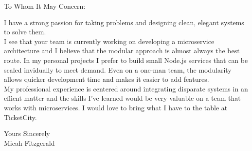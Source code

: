 \documentclass[a4paper,english]{friggeri-letter}
\begin{document}

\address{ 
   4605 Avenue A\\
   Apt \#213 \\
   Austin, TX 78751
}


\opening{To Whom It May Concern:} 
I have a strong passion for taking problems and designing clean, elegant systems to solve them.\\ 
I see that your team is currently working on developing a microservice architecture and I believe that the modular approach is almost always the best route. In my personal projects I prefer to build small Node.js services that can be scaled invidually to meet demand. Even on a one-man team, the modularity allows quicker development time and makes it easier to add features. \\
My professional experience is centered around integrating disparate systems in an effient matter and the skills I've learned would be very valuable on a team that works with microservices. I would love to bring what I have to the table at TicketCity. 

\closing{
   Yours Sincerely\\
   Micah Fitzgerald} 
\end{document}
